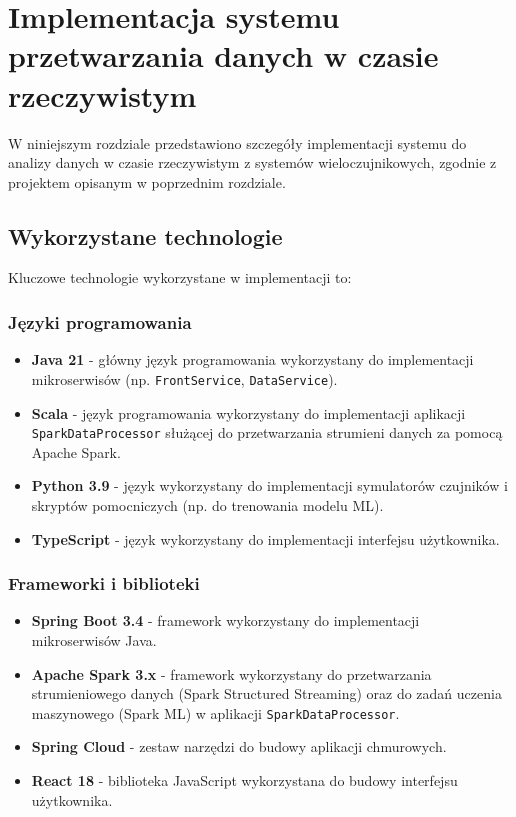 \section{Implementacja systemu przetwarzania danych w czasie rzeczywistym}
\label{sec:implementacja_systemu}

W niniejszym rozdziale przedstawiono szczegóły implementacji systemu do analizy danych w czasie rzeczywistym z systemów wieloczujnikowych,
zgodnie z projektem opisanym w poprzednim rozdziale.

\subsection{Wykorzystane technologie}
\label{subsec:technologie}

Kluczowe technologie wykorzystane w implementacji to:

\subsubsection{Języki programowania}
\label{subsubsec:jezyki_programowania}

\begin{itemize}
    \item \textbf{Java 21} - główny język programowania wykorzystany do implementacji mikroserwisów (np. \texttt{FrontService}, \texttt{DataService}).
    \item \textbf{Scala} - język programowania wykorzystany do implementacji aplikacji \texttt{SparkDataProcessor} służącej do przetwarzania strumieni danych za pomocą Apache Spark.
    \item \textbf{Python 3.9} - język wykorzystany do implementacji symulatorów czujników i skryptów pomocniczych (np. do trenowania modelu ML).
    \item \textbf{TypeScript} - język wykorzystany do implementacji interfejsu użytkownika.
\end{itemize}

\subsubsection{Frameworki i biblioteki}
\label{subsubsec:frameworki}

\begin{itemize}
    \item \textbf{Spring Boot 3.4} - framework wykorzystany do implementacji mikroserwisów Java.
    \item \textbf{Apache Spark 3.x} - framework wykorzystany do przetwarzania strumieniowego danych (Spark Structured Streaming) oraz do zadań uczenia maszynowego (Spark ML) w aplikacji \texttt{SparkDataProcessor}.
    \item \textbf{Spring Cloud} - zestaw narzędzi do budowy aplikacji chmurowych.
    \item \textbf{React 18} - biblioteka JavaScript wykorzystana do budowy interfejsu użytkownika.
\end{itemize}

